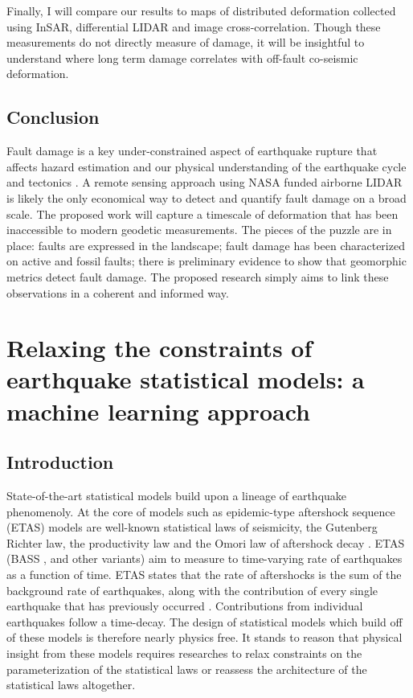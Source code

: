 \documentclass[12pt, notitlepage]{report}
\begin{document}
Finally, I will compare our results to maps of distributed deformation collected using InSAR, differential LIDAR and image cross-correlation. Though these measurements do not directly measure of damage, it will be insightful to understand where long term damage correlates with off-fault co-seismic deformation. 

\section{Conclusion}

Fault damage is a key under-constrained aspect of earthquake rupture that affects hazard estimation and our physical understanding of the earthquake cycle and tectonics \cite{savage2011collateral, Chester2009CharacterizationGeneration,lyakhovsky2014fault,Roy2016,shipton2006missing, Faulkner2006SlipZone}. A remote sensing approach using NASA funded airborne LIDAR is likely the only economical way to detect and quantify fault damage on a broad scale. The proposed work will capture a timescale of deformation that has been inaccessible to modern geodetic measurements. The pieces of the puzzle are in place: faults are expressed in the landscape; fault damage has been characterized on active and fossil faults; there is preliminary evidence to show that geomorphic metrics detect fault damage. The proposed research simply aims to link these observations in a coherent and informed way. 

\chapter{Relaxing the constraints of earthquake statistical models: a machine learning approach}\label{cpt:ML}

\section{Introduction}

State-of-the-art statistical models build upon a lineage of earthquake phenomenoly. At the core of models such as epidemic-type aftershock sequence (ETAS) models are well-known statistical laws of seismicity, the Gutenberg Richter law, the productivity law and the Omori law of aftershock decay \cite{Knopoff1982, ogata2017statistics}. ETAS (BASS \cite{Holliday2008Self-similarSequences,Holliday2008ABASS}, and other variants) aim to measure to time-varying rate of earthquakes as a function of time. ETAS states that the rate of aftershocks is the sum of the background rate of earthquakes, along with the contribution of every single earthquake that has previously occurred \cite{Ogata1988StatisticalProcesses}. Contributions from individual earthquakes follow a time-decay. The design of statistical models which build off of these models is therefore nearly physics free. It stands to reason that physical insight from these models requires researches to relax constraints on the parameterization of the statistical laws or reassess the architecture of the statistical laws altogether.
\end{document}
